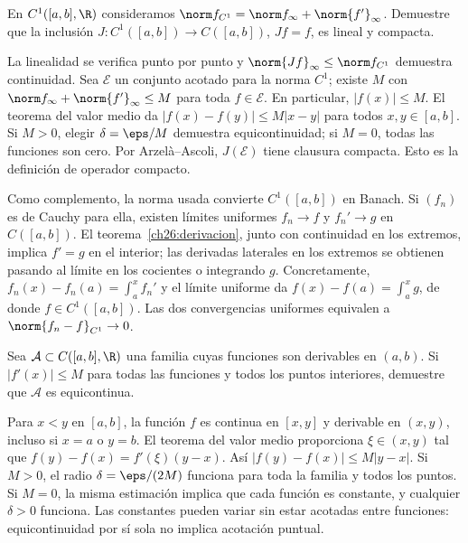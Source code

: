 \begin{ejercicio}\label{ej:lectura-27-3}
En $C^1([a,b],\R)$ consideramos $\norm f_{C^1}=\norm f_\infty+\norm{f'}_\infty$. Demuestre que la inclusión $J:C^1([a,b])\to C([a,b])$, $Jf=f$, es lineal y compacta.
\end{ejercicio}
\begin{solucion}
La linealidad se verifica punto por punto y $\norm{Jf}_\infty\le\norm f_{C^1}$ demuestra continuidad. Sea $\mathcal E$ un conjunto acotado para la norma $C^1$; existe $M$ con $\norm f_\infty+\norm{f'}_\infty\le M$ para toda $f\in\mathcal E$. En particular, $|f(x)|\le M$. El teorema del valor medio da
$|f(x)-f(y)|\le M|x-y|$ para todos $x,y\in[a,b]$. Si $M>0$, elegir $\delta=\eps/M$ demuestra equicontinuidad; si $M=0$, todas las funciones son cero. Por Arzelà--Ascoli, $J(\mathcal E)$ tiene clausura compacta. Esto es la definición de operador compacto.

Como complemento, la norma usada convierte $C^1([a,b])$ en Banach. Si $(f_n)$ es de Cauchy para ella, existen límites uniformes $f_n\to f$ y $f_n'\to g$ en $C([a,b])$. El teorema~\ref{ch26:derivacion}, junto con continuidad en los extremos, implica $f'=g$ en el interior; las derivadas laterales en los extremos se obtienen pasando al límite en los cocientes o integrando $g$. Concretamente, $f_n(x)-f_n(a)=\int_a^x f_n'$ y el límite uniforme da $f(x)-f(a)=\int_a^xg$, de donde $f\in C^1([a,b])$. Las dos convergencias uniformes equivalen a $\norm{f_n-f}_{C^1}\to0$.
\end{solucion}

\begin{ejercicio}\label{ej:lectura-27-4}
Sea $\mathcal A\subset C([a,b],\R)$ una familia cuyas funciones son derivables en $(a,b)$. Si $|f'(x)|\le M$ para todas las funciones y todos los puntos interiores, demuestre que $\mathcal A$ es equicontinua.
\end{ejercicio}
\begin{solucion}
Para $x<y$ en $[a,b]$, la función $f$ es continua en $[x,y]$ y derivable en $(x,y)$, incluso si $x=a$ o $y=b$. El teorema del valor medio proporciona $\xi\in(x,y)$ tal que $f(y)-f(x)=f'(\xi)(y-x)$. Así $|f(y)-f(x)|\le M|y-x|$. Si $M>0$, el radio $\delta=\eps/(2M)$ funciona para toda la familia y todos los puntos. Si $M=0$, la misma estimación implica que cada función es constante, y cualquier $\delta>0$ funciona. Las constantes pueden variar sin estar acotadas entre funciones: equicontinuidad por sí sola no implica acotación puntual.
\end{solucion}

